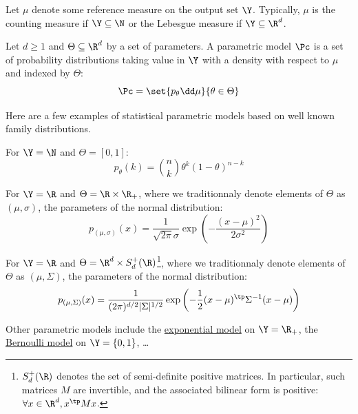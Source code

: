 \documentclass[toc, titlepaged]{../cs-classes/cs-classes}
\begin{document}
Let $\mu$ denote some reference measure on the output set $\Y$. Typically, $\mu$ is the counting measure if $\Y\subseteq\N$ or the Lebesgue measure if $\Y\subseteq\R^d$.

\begin{definition}
    Let $d\geq1$ and $\Theta\subseteq\R^d$ by a set of parameters. A parametric model $\Pc$ is a set of probability distributions taking value in $\Y$ with a density with respect to $\mu$ and indexed by $\Theta$:
    \begin{equation}
        \Pc = \set{p_\theta\dd\mu}{\theta\in\Theta}
    \end{equation}
\end{definition}

Here are a few examples of statistical parametric models based on well known family distributions.
\begin{example}
    For $\Y=\N$ and $\Theta=[0, 1]$:
    \begin{equation*}
        p_\theta(k) = \binom{n}{k}\theta^k(1-\theta)^{n-k}
    \end{equation*}
\end{example}

\begin{example}
    For $\Y=\R$ and $\Theta=\R\times\R_+$, where we traditionnaly denote elements of $\Theta$ as $(\mu, \sigma)$, the parameters of the normal distribution:
    \begin{equation*}
        p_{(\mu, \sigma)}(x) = \frac{1}{\sqrt{2\pi}\sigma} \exp\left(-\frac{(x-\mu)^2}{2\sigma^2}\right)
    \end{equation*}
\end{example}

\begin{example}
    For $\Y=\R$ and $\Theta=\R^d\times S_d^+(\R)$\footnote{$S_d^+(\R)$ denotes the set of semi-definite positive matrices. In particular, such matrices $M$ are invertible, and the associated bilinear form is positive: $\forall x\in\R^d, x^\tp Mx$.}, where we traditionnaly denote elements of $\Theta$ as $(\mu, \Sigma)$, the parameters of the normal distribution:
    \begin{equation*}
        p_{(\mu, \Sigma)}(x) = \frac{1}{(2\pi)^{d/2}|\Sigma|^{1/2}} \exp\left(-\frac{1}{2}(x-\mu)^\tp\Sigma^{-1}(x-\mu)\right)
    \end{equation*}
\end{example}
Other parametric models include the \href{https://en.wikipedia.org/wiki/Exponential_distribution}{exponential model} on $\Y=\R_+$, the \href{https://en.wikipedia.org/wiki/Bernoulli_distribution}{Bernoulli model} on $\Y=\{0, 1\}$, \dots
\end{document}
